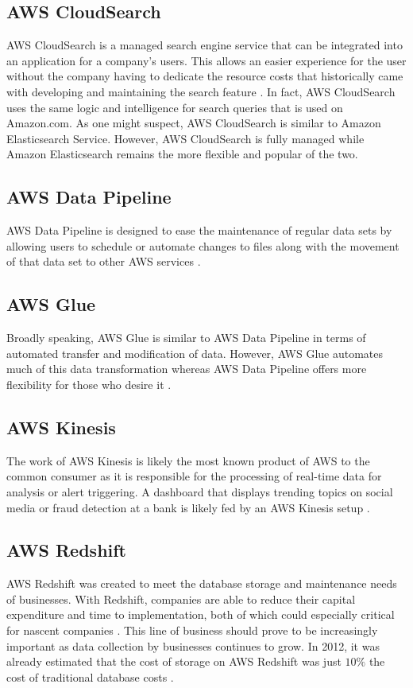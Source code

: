 \documentclass[sigconf]{acmart}
\begin{document}
\subsection{AWS CloudSearch}
AWS CloudSearch is a managed search engine service that can be integrated into an application for a company's users. This allows an easier experience for the user without the company having to dedicate the resource costs that historically came with developing and maintaining the search feature \cite{clouds}. In fact, AWS CloudSearch uses the same logic and intelligence for search queries that is used on Amazon.com. As one might suspect, AWS CloudSearch is similar to Amazon Elasticsearch Service. However, AWS CloudSearch is fully managed while Amazon Elasticsearch remains the more flexible and popular of the two.

\subsection{AWS Data Pipeline}
AWS Data Pipeline is designed to ease the maintenance of regular data sets by allowing users to schedule or automate changes to files along with the movement of that data set to other AWS services \cite{datapipe}. 
\subsection{AWS Glue}
Broadly speaking, AWS Glue is similar to AWS Data Pipeline in terms of automated transfer and modification of data. However, AWS Glue automates much of this data transformation whereas AWS Data Pipeline offers more flexibility for those who desire it \cite{glue}.
\subsection{AWS Kinesis}
The work of AWS Kinesis is likely the most known product of AWS to the common consumer as it is responsible for the processing of real-time data for analysis or alert triggering. A dashboard that displays trending topics on social media or fraud detection at a bank is likely fed by an AWS Kinesis setup \cite{kinesis}. 
\subsection{AWS Redshift}
AWS Redshift was created to meet the database storage and maintenance needs of businesses. With Redshift, companies are able to reduce their capital expenditure and time to implementation, both of which could especially critical for nascent companies \cite{redshift1}. This line of business should prove to be increasingly important as data collection by businesses continues to grow. In 2012, it was already estimated that the cost of storage on AWS Redshift was just $10\%$ the cost of traditional database costs \cite{redshift2}. 
\end{document}
